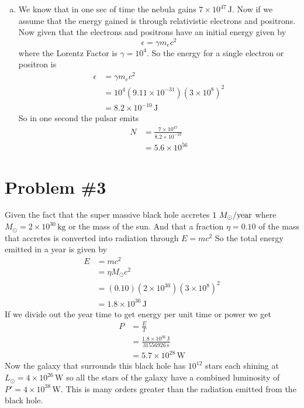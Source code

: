 \documentclass[11pt]{article}
\numberwithin{equation}{section}
\newcommand{\unit}[1]{\ensuremath{\, \mathrm{#1}}}
\begin{document}
\begin{enumerate}[(a)]
\item
We know that in one sec of time the nebula gains $7\times10^{47}\unit{J}$. Now if we assume that the energy gained is through relativistic electrons and positrons. Now given that the electrons and positrons have an initial energy given by
$$\epsilon = \gamma m_ec^2$$ 
where the Lorentz Factor is $\gamma = 10^4$. So the energy for a single electron or positron is 
\begin{align*}
\epsilon &= \gamma m_ec^2\\ 
&= 10^4(9.11\times10^{-31})(3\times10^{8})^2\\ 
&= 8.2\times10^{-10}\unit{J}
\end{align*}
So in one second the pulsar emits 
\begin{align*}
N &= \frac{7\times10^{47}}{ 8.2\times10^{-10}}\\
&= 5.6\times10^{56}
\end{align*}
\end{enumerate}

\section{Problem \#3}
Given the fact that the super massive black hole accretes $1\ M_{\odot}/\textnormal{year}$ where $M_{\odot} = 2\times10^{30}\unit{kg}$ or the mass of the sun. And that a fraction $\eta=0.10$ of the mass that accretes is converted into radiation through
$E = mc^2$
So the total energy emitted in a year is given by
\begin{align*}
E &= mc^2\\
&= \eta M_{\odot}c^2\\
&= (0.10)(2\times10^{30})(3\times10^{8})^2\\
&= 1.8\times10^{36}\unit{J}
\end{align*}
If we divide out the year time to get energy per unit time or power we get
\begin{align*}
P &= \frac{E}{T}\\
&= \frac{1.8\times10^{36}\unit{J}}{31556926\unit{s}}\\
&= 5.7\times10^{28}\unit{W}
\end{align*}
Now the galaxy that surrounds this black hole has $10^{12}$ stars each shining at $L_{\odot} = 4\times10^{26}\unit{W}$ so all the stars of the galaxy have a combined luminosity of $P' = 4\times10^{38}\unit{W}$. This is many orders greater than the radiation emitted from the black hole.
\end{document}
